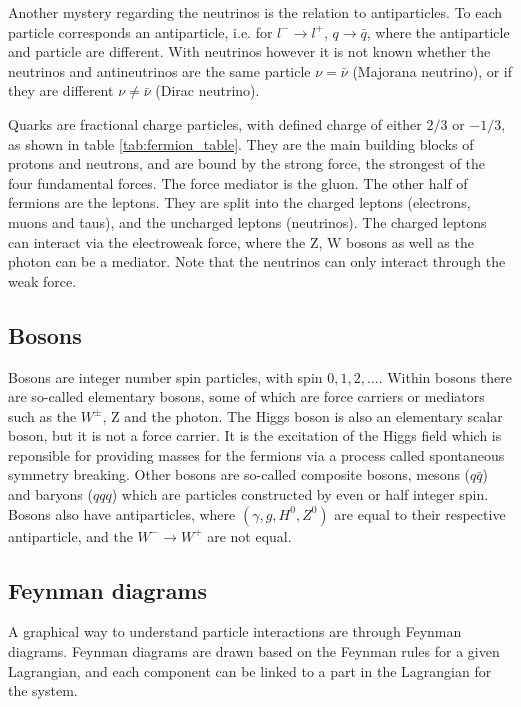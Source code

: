 Another mystery regarding the neutrinos is the relation to antiparticles. To each particle corresponds an antiparticle, i.e. for $l^-\to l^+$, $q\to \bar{q}$, where the antiparticle 
and particle are different. With neutrinos however it is not known whether the neutrinos and antineutrinos are the same particle $\nu = \bar{\nu}$ (Majorana neutrino), 
or if they are different $\nu \neq \bar{\nu}$ (Dirac neutrino).
\par
Quarks are fractional charge particles, with defined charge of either $2/3$ or $-1/3$, as shown in table \ref{tab:fermion_table}. They are the main building blocks of protons and neutrons, and are bound by the strong 
force, the strongest of the four fundamental forces. The force mediator is the gluon. The other half of fermions are the leptons. They are split into the charged 
leptons (electrons, muons and taus), and the uncharged leptons (neutrinos). The charged leptons can interact via the electroweak force, where the Z, W bosons 
as well as the photon can be a mediator. Note that the neutrinos can only interact through the weak force.

\subsection*{Bosons}
Bosons are integer number spin particles, with spin $0, 1, 2, ...$. Within bosons there are so-called elementary bosons, some 
of which are force carriers or mediators such as the $W^{\pm}$, Z and the photon. The Higgs boson is also an elementary scalar 
boson, but it is not a force carrier. It is the excitation of the Higgs field which is reponsible for providing masses for the 
fermions via a process called spontaneous symmetry breaking\cite{Pich:819632}. Other bosons are so-called composite bosons, mesons 
($q\bar{q}$) and baryons ($qqq$) which are particles constructed by even or half integer spin. Bosons also have antiparticles, 
where $(\gamma, g, H^{0}, Z^{0})$ are equal to their respective antiparticle, and the $W^{-} \to W^{+}$ are not equal.

\subsection*{Feynman diagrams}
A graphical way to understand particle interactions are through Feynman diagrams. Feynman diagrams 
are drawn based on the Feynman rules for a given Lagrangian\cite{Pich:819632}\cite{feynrules}, 
and each component can be linked to a part in the Lagrangian for the system. 

